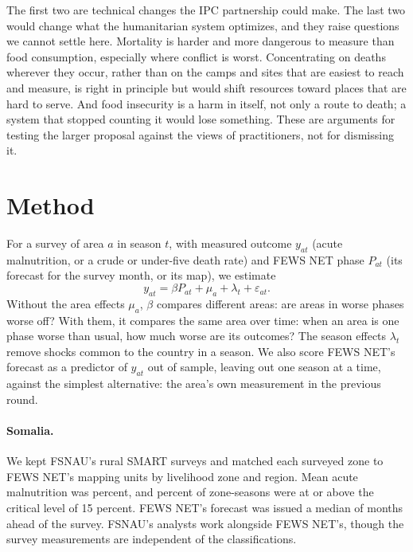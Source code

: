 \documentclass[11pt]{article}
\begin{document}
The first two are technical changes the IPC partnership could make. The last two would change what the humanitarian system optimizes, and they raise questions we cannot settle here. Mortality is harder and more dangerous to measure than food consumption, especially where conflict is worst. Concentrating on deaths wherever they occur, rather than on the camps and sites that are easiest to reach and measure, is right in principle but would shift resources toward places that are hard to serve. And food insecurity is a harm in itself, not only a route to death; a system that stopped counting it would lose something. These are arguments for testing the larger proposal against the views of practitioners, not for dismissing it.

\FloatBarrier
\appendix
\section{Method}\label{app:method}

For a survey of area $a$ in season $t$, with measured outcome $y_{at}$ (acute malnutrition, or a crude or under-five death rate) and FEWS NET phase $P_{at}$ (its forecast for the survey month, or its map), we estimate
\begin{equation*}
y_{at} = \beta P_{at} + \mu_a + \lambda_t + \varepsilon_{at}.
\end{equation*}
Without the area effects $\mu_a$, $\beta$ compares different areas: are areas in worse phases worse off? With them, it compares the same area over time: when an area is one phase worse than usual, how much worse are its outcomes? The season effects $\lambda_t$ remove shocks common to the country in a season. We also score FEWS NET's forecast as a predictor of $y_{at}$ out of sample, leaving out one season at a time, against the simplest alternative: the area's own measurement in the previous round.

\paragraph{Somalia.} We kept FSNAU's rural SMART surveys and matched each surveyed zone to FEWS NET's mapping units by livelihood zone and region. Mean acute malnutrition was \fsGam{} percent, and \fsCrit{} percent of zone-seasons were at or above the critical level of 15 percent. FEWS NET's forecast was issued a median of \fsLead{} months ahead of the survey. FSNAU's analysts work alongside FEWS NET's, though the survey measurements are independent of the classifications.
\end{document}
